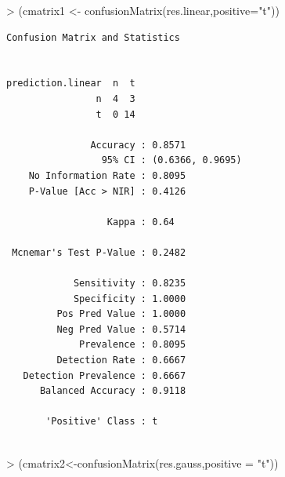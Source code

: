 \documentclass[
]{article}
\newenvironment{Shaded}{\begin{snugshade}}{\end{snugshade}}
\newcommand{\AttributeTok}[1]{\textcolor[rgb]{0.80,0.80,0.80}{#1}}
\newcommand{\FunctionTok}[1]{\textcolor[rgb]{0.94,0.94,0.56}{#1}}
\newcommand{\NormalTok}[1]{\textcolor[rgb]{0.80,0.80,0.80}{#1}}
\newcommand{\OtherTok}[1]{\textcolor[rgb]{0.94,0.94,0.56}{#1}}
\newcommand{\SpecialCharTok}[1]{\textcolor[rgb]{0.86,0.64,0.64}{#1}}
\newcommand{\StringTok}[1]{\textcolor[rgb]{0.80,0.58,0.58}{#1}}
\begin{document}
\begin{Shaded}
\begin{Highlighting}[]
\SpecialCharTok{\textgreater{}}\NormalTok{ (cmatrix1 }\OtherTok{\textless{}{-}} \FunctionTok{confusionMatrix}\NormalTok{(res.linear,}\AttributeTok{positive=}\StringTok{"t"}\NormalTok{))}
\end{Highlighting}
\end{Shaded}

\begin{verbatim}
Confusion Matrix and Statistics

                 
prediction.linear  n  t
                n  4  3
                t  0 14
                                          
               Accuracy : 0.8571          
                 95% CI : (0.6366, 0.9695)
    No Information Rate : 0.8095          
    P-Value [Acc > NIR] : 0.4126          
                                          
                  Kappa : 0.64            
                                          
 Mcnemar's Test P-Value : 0.2482          
                                          
            Sensitivity : 0.8235          
            Specificity : 1.0000          
         Pos Pred Value : 1.0000          
         Neg Pred Value : 0.5714          
             Prevalence : 0.8095          
         Detection Rate : 0.6667          
   Detection Prevalence : 0.6667          
      Balanced Accuracy : 0.9118          
                                          
       'Positive' Class : t               
                                          
\end{verbatim}

\begin{Shaded}
\begin{Highlighting}[]
\SpecialCharTok{\textgreater{}}\NormalTok{ (cmatrix2}\OtherTok{\textless{}{-}}\FunctionTok{confusionMatrix}\NormalTok{(res.gauss,}\AttributeTok{positive =} \StringTok{"t"}\NormalTok{))}
\end{Highlighting}
\end{Shaded}
\end{document}

